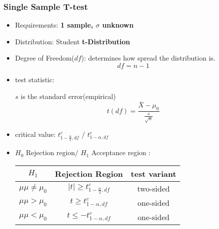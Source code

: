 \subsubsection{Single Sample T-test}
\begin{itemize}
	\item Requirements: \textbf{1 sample, $\sigma$ unknown}
	\item Distribution: Student \textbf{t-Distribution}
	\item Degree of Freedom($df$): determines how spread the distribution is. 
	\large{$$df = n - 1$$}
	\item test statistic: 
	
	$s$ is the standard error(empirical)
	\large{$$t(df) = \frac{\bar{X} - \mu_0}{\frac{s}{\sqrt{n}}}$$}
	\item critical value: $t^c_{1-\frac{\alpha}{2}, df}$ / $t^c_{1-\alpha, df}$
	\item $H_0$ Rejection region/ $H_1$ Acceptance region :
	
	\begin{table}[H]
		\begin{center}
			\begin{tabular}{|c|c|c|}
				\hline
				$H_1$ 				& Rejection Region					& test variant \\ \hline
				$\mu\mu \neq \mu_0$	& $|t| \geq t^c_{1-\frac{\alpha}{2}, df}$	& two-sided                 \\ \hline
				$\mu\mu > \mu_0$	& $ t \geq t^c_{1-\alpha, df}$			& one-sided                  \\ \hline
				$\mu\mu < \mu_0$	& $ t \leq -t^c_{1-\alpha,df} $			& one-sided                  \\ \hline
			\end{tabular}
		\end{center}
	\end{table} 		
\end{itemize}

